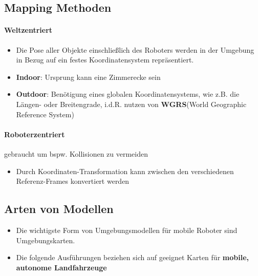 \subsection{Mapping Methoden}
\paragraph{Weltzentriert}
\begin{itemize}
	\item Die Pose aller Objekte einschließlich des Roboters werden in der Umgebung in Bezug auf ein festes Koordinatensystem repräsentiert.
	\item \textbf{Indoor}: Ursprung kann eine Zimmerecke sein
	\item \textbf{Outdoor}: Benötigung eines globalen Koordinatensystems, wie z.B. die Längen- oder Breitengrade, i.d.R. nutzen von \textbf{WGRS}(World Geographic Reference System)
\end{itemize}
\paragraph{Roboterzentriert} gebraucht um bspw. Kollisionen zu vermeiden
\begin{itemize}
	\item Durch Koordinaten-Transformation kann zwischen den verschiedenen Referenz-Frames konvertiert werden
\end{itemize}
\subsection{Arten von Modellen}
\begin{itemize}
	\item Die wichtigste Form von Umgebungsmodellen für mobile Roboter sind Umgebungskarten.
	\item Die folgende Ausführungen beziehen sich auf geeignet Karten für \textbf{mobile, autonome Landfahrzeuge}
\end{itemize}





































